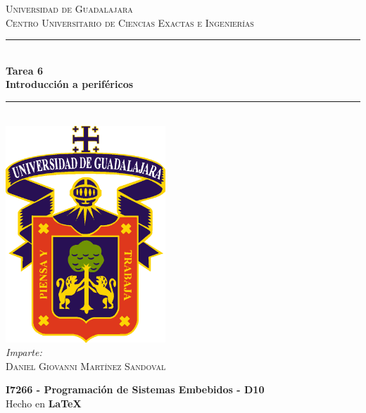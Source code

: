 \documentclass[11pt,letterpaper]{article}
\newcommand{\HRule}{\rule{\linewidth}{0.5mm}} %
\begin{document}

\begin{titlepage}
    \center
    
    \textsc{\LARGE Universidad de Guadalajara}\\[0.2cm] %
    \textsc{Centro Universitario de Ciencias Exactas e Ingenierías}\\[1cm]
    
    \HRule \\[0.3cm]
    { 
        \LARGE \textbf{Tarea 6} \\[0.3cm]
        \large \textbf{Introducción a periféricos} \\[0.3cm]
    }
    \HRule \\[2cm]
    
    \includegraphics[width=6cm]{assets/logo_udg_color.eps}\\[1.25cm] %
    
    \center
    \vspace{1cm}
    \emph{Imparte:} \\ %
    \textsc{Daniel Giovanni Martínez Sandoval} 
    
    \vfill
    \textbf{I7266 - Programación de Sistemas Embebidos - D10} \\
    Hecho en \textbf{\LaTeX}	
\end{titlepage}



\end{document}
